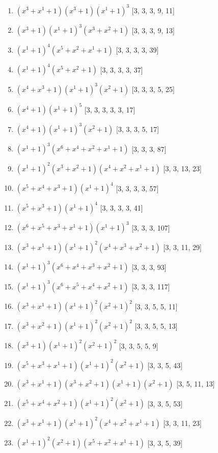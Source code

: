 \documentclass[10pt,twocolumn]{article}
\begin{document}
\begin{enumerate}
\item $(x^{3} + x^{1} + 1)(x^{3} + 1)(x^{1} + 1)^{3}$  [3, 3, 3, 9, 11]
\item $(x^{3} + 1)(x^{1} + 1)^{3}(x^{3} + x^{2} + 1)$  [3, 3, 3, 9, 13]
\item $(x^{1} + 1)^{4}(x^{5} + x^{2} + x^{1} + 1)$  [3, 3, 3, 3, 39]
\item $(x^{1} + 1)^{4}(x^{5} + x^{2} + 1)$  [3, 3, 3, 3, 37]
\item $(x^{4} + x^{3} + 1)(x^{1} + 1)^{3}(x^{2} + 1)$  [3, 3, 3, 5, 25]
\item $(x^{4} + 1)(x^{1} + 1)^{5}$  [3, 3, 3, 3, 3, 17]
\item $(x^{4} + 1)(x^{1} + 1)^{3}(x^{2} + 1)$  [3, 3, 3, 5, 17]
\item $(x^{1} + 1)^{3}(x^{6} + x^{4} + x^{2} + x^{1} + 1)$  [3, 3, 3, 87]
\item $(x^{1} + 1)^{2}(x^{3} + x^{2} + 1)(x^{4} + x^{2} + x^{1} + 1)$  [3, 3, 13, 23]
\item $(x^{5} + x^{4} + x^{3} + 1)(x^{1} + 1)^{4}$  [3, 3, 3, 3, 57]
\item $(x^{5} + x^{3} + 1)(x^{1} + 1)^{4}$  [3, 3, 3, 3, 41]
\item $(x^{6} + x^{5} + x^{3} + x^{1} + 1)(x^{1} + 1)^{3}$  [3, 3, 3, 107]
\item $(x^{3} + x^{1} + 1)(x^{1} + 1)^{2}(x^{4} + x^{3} + x^{2} + 1)$  [3, 3, 11, 29]
\item $(x^{1} + 1)^{3}(x^{6} + x^{4} + x^{3} + x^{2} + 1)$  [3, 3, 3, 93]
\item $(x^{1} + 1)^{3}(x^{6} + x^{5} + x^{4} + x^{2} + 1)$  [3, 3, 3, 117]
\item $(x^{3} + x^{1} + 1)(x^{1} + 1)^{2}(x^{2} + 1)^{2}$  [3, 3, 5, 5, 11]
\item $(x^{3} + x^{2} + 1)(x^{1} + 1)^{2}(x^{2} + 1)^{2}$  [3, 3, 5, 5, 13]
\item $(x^{3} + 1)(x^{1} + 1)^{2}(x^{2} + 1)^{2}$  [3, 3, 5, 5, 9]
\item $(x^{5} + x^{3} + x^{1} + 1)(x^{1} + 1)^{2}(x^{2} + 1)$  [3, 3, 5, 43]
\item $(x^{3} + x^{1} + 1)(x^{3} + x^{2} + 1)(x^{1} + 1)(x^{2} + 1)$  [3, 5, 11, 13]
\item $(x^{5} + x^{4} + x^{2} + 1)(x^{1} + 1)^{2}(x^{2} + 1)$  [3, 3, 5, 53]
\item $(x^{3} + x^{1} + 1)(x^{1} + 1)^{2}(x^{4} + x^{2} + x^{1} + 1)$  [3, 3, 11, 23]
\item $(x^{1} + 1)^{2}(x^{2} + 1)(x^{5} + x^{2} + x^{1} + 1)$  [3, 3, 5, 39]

\end{enumerate}
\end{document}
